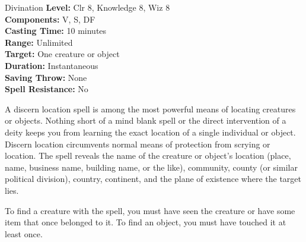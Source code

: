 {Divination}
{
	\textbf{Level:}
	Clr 8, Knowledge 8, Wiz 8\\
	\textbf{Components:}
	V, S, DF\\
	\textbf{Casting Time:}
	10 minutes\\
	\textbf{Range:}
	Unlimited\\
	\textbf{Target:}
	One creature or object\\
	\textbf{Duration:}
	Instantaneous\\
	\textbf{Saving Throw:}
	None\\
	\textbf{Spell Resistance:}
	No\\
}
{
	A discern location spell is among the most powerful means of locating creatures or objects. Nothing short of a mind blank spell or the direct intervention of a deity keeps you from learning the exact location of a single individual or object. Discern location circumvents normal means of protection from scrying or location. The spell reveals the name of the creature or object's location (place, name, business name, building name, or the like), community, county (or similar political division), country, continent, and the plane of existence where the target lies.

	To find a creature with the spell, you must have seen the creature or have some item that once belonged to it. To find an object, you must have touched it at least once.

}
